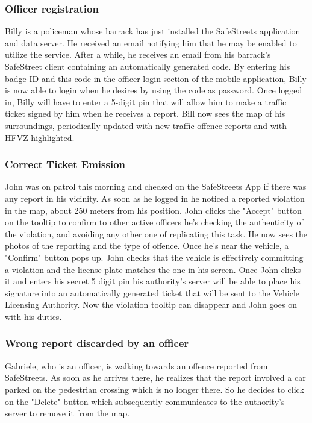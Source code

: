 \documentclass[12pt,a4paper]{article}
\begin{document}
\subsubsection{Officer registration}
Billy is a policeman whose barrack has just installed the SafeStreets application and data server. He received an email notifying him that he may be enabled to utilize the service. After a while, he receives an email from his barrack's SafeStreet client containing an automatically generated code. By entering his badge ID and this code in the officer login section of the mobile application, Billy is now able to login when he desires by using the code as password. Once logged in, Billy will have to enter a 5-digit pin that will allow him to make a traffic ticket signed by him when he receives a report.
Bill now sees the map of his surroundings, periodically updated with new traffic offence reports and with HFVZ highlighted. 

\subsubsection{Correct Ticket Emission}
John was on patrol this morning and checked on the SafeStreets App if there was any report in his vicinity. As soon as he logged in he noticed a reported violation in the map, about 250 meters from his position. John clicks the "Accept" button on the tooltip to confirm to other active officers he's checking the authenticity of the violation, and avoiding any other one of replicating this task. He now sees the photos of the reporting and the type of offence. Once he's near the vehicle, a "Confirm" button pops up. John checks that the vehicle is effectively committing a violation and the license plate matches the one in his screen. Once John clicks it and enters his secret 5 digit pin his authority's server will be able to place his signature into an automatically generated ticket that will be sent to the Vehicle Licensing Authority. Now the violation tooltip can disappear and John goes on with his duties.

\subsubsection{Wrong report discarded by an officer}
Gabriele, who is an officer, is walking towards an offence reported from SafeStreets. As soon as he arrives there, he realizes that the report involved a car parked on the pedestrian crossing which is no longer there. So he decides to click on the "Delete" button which subsequently communicates to the authority's server to remove it from the map.
\end{document}

